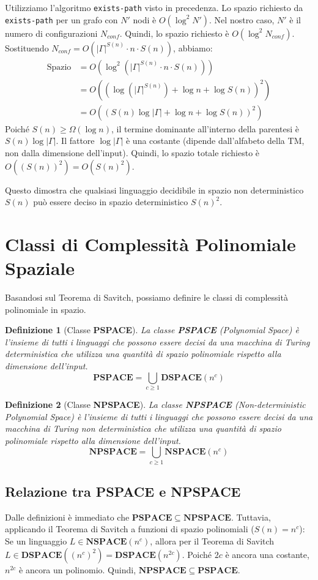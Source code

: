 \documentclass[a4paper]{article}
\newtheorem{definition}{Definizione}
\begin{document}
\begin{enumerate}
    Utilizziamo l'algoritmo \texttt{exists-path} visto in precedenza. Lo spazio richiesto da \texttt{exists-path} per un grafo con $N'$ nodi è $O(\log^2 N')$.
    Nel nostro caso, $N'$ è il numero di configurazioni $N_{conf}$.
    Quindi, lo spazio richiesto è $O(\log^2 N_{conf})$.
    Sostituendo $N_{conf} = O(|\Gamma|^{S(n)} \cdot n \cdot S(n))$, abbiamo:
    \begin{align*} \text{Spazio} &= O(\log^2 (|\Gamma|^{S(n)} \cdot n \cdot S(n))) \\ &= O((\log (|\Gamma|^{S(n)}) + \log n + \log S(n))^2) \\ &= O((S(n)\log|\Gamma| + \log n + \log S(n))^2)\end{align*}
    Poiché $S(n) \ge \Omega(\log n)$, il termine dominante all'interno della parentesi è $S(n)\log|\Gamma|$.
    Il fattore $\log|\Gamma|$ è una costante (dipende dall'alfabeto della TM, non dalla dimensione dell'input).
    Quindi, lo spazio totale richiesto è $O((S(n))^2) = O(S(n)^2)$.
\end{enumerate}
Questo dimostra che qualsiasi linguaggio decidibile in spazio non deterministico $S(n)$ può essere deciso in spazio deterministico $S(n)^2$.

\section{Classi di Complessità Polinomiale Spaziale}
Basandosi sul Teorema di Savitch, possiamo definire le classi di complessità polinomiale in spazio.

\begin{definition}[Classe \textbf{PSPACE}]
La classe \textbf{PSPACE} (Polynomial Space) è l'insieme di tutti i linguaggi che possono essere decisi da una macchina di Turing deterministica che utilizza una quantità di spazio polinomiale rispetto alla dimensione dell'input.
\[ \mathbf{PSPACE} = \bigcup_{c \ge 1} \mathbf{DSPACE}(n^c) \]
\end{definition}

\begin{definition}[Classe \textbf{NPSPACE}]
La classe \textbf{NPSPACE} (Non-deterministic Polynomial Space) è l'insieme di tutti i linguaggi che possono essere decisi da una macchina di Turing non deterministica che utilizza una quantità di spazio polinomiale rispetto alla dimensione dell'input.
\[ \mathbf{NPSPACE} = \bigcup_{c \ge 1} \mathbf{NSPACE}(n^c) \]
\end{definition}

\subsection{Relazione tra PSPACE e NPSPACE}
Dalle definizioni è immediato che $\mathbf{PSPACE} \subseteq \mathbf{NPSPACE}$.
Tuttavia, applicando il Teorema di Savitch a funzioni di spazio polinomiali ($S(n) = n^c$):
Se un linguaggio $L \in \mathbf{NSPACE}(n^c)$, allora per il Teorema di Savitch $L \in \mathbf{DSPACE}((n^c)^2) = \mathbf{DSPACE}(n^{2c})$. Poiché $2c$ è ancora una costante, $n^{2c}$ è ancora un polinomio.
Quindi, $\mathbf{NPSPACE} \subseteq \mathbf{PSPACE}$.
\end{document}
